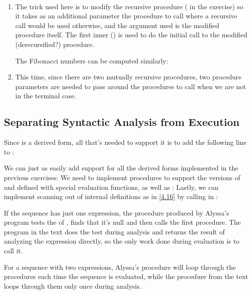 \begin{exe}[4.21]
    \ \vspace{-20pt}
    \begin{enumerate}
        \item The trick used here is to modify the recursive procedure 
            ( in the exercise) so it takes as an 
            additional parameter the procedure to call where a recursive call 
            would be used otherwise, and the argument used is the modified 
            procedure itself. The first inner 
	    () is used to do the initial call to the 
	    modified (derecursified?) procedure.

	    The Fibonacci numbers can be computed similarly:

        \item This time, since there are two mutually recursive procedures, two 
            procedure parameters are needed to pass around the procedures to 
            call when we are not in the terminal case.
    \end{enumerate}
\end{exe}

\subsection{Separating Syntactic Analysis from Execution}

\begin{exe}[4.22]
    Since  is a derived form, all that’s needed to support it is to 
    add the following line to :
    \begin{comp}
        We can just as easily add support for all the derived forms implemented 
        in the previous exercises:
        We need to implement  procedures to support the versions of 
         and  defined with special evaluation functions, as 
        well as :
	Lastly, we can implement scanning out of internal definitions as in 
	\autoref{4.16} by calling  in 
	:
    \end{comp}
\end{exe}

\begin{exe}[4.23]
    If the sequence has just one expression, the procedure produced by Alyssa’s 
    program tests the  of , finds that it’s null and then 
    calls the first procedure. The program in the text does the test during 
    analysis and returns the result of analyzing the expression directly, so the 
    only work done during evaluation is to call it.

    For a sequence with two expressions, Alyssa’s procedure will loop through 
    the procedures each time the sequence is evaluated, while the procedure from 
    the text loops through them only once during analysis.
\end{exe}

